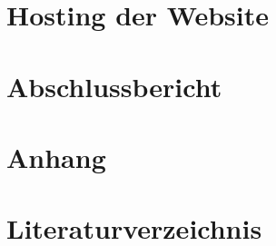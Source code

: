 \documentclass[12pt,a4paper]{article}
\begin{document}
\section{Hosting der Website}


\section{Abschlussbericht}


\section{Anhang}


\section{Literaturverzeichnis}


\newpage
\listoffigures
\end{document}

